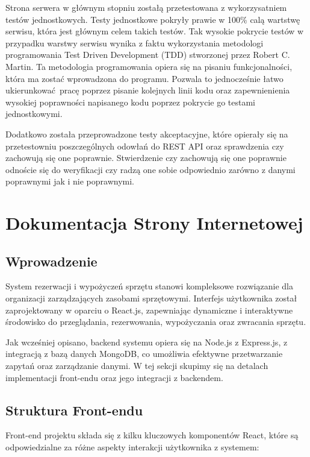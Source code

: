 \documentclass{article}
\begin{document}
Strona serwera w głównym stopniu zostałą przetestowana z wykorzysatniem testów jednostkowych. Testy jednostkowe pokryły prawie w 100\% calą wartstwę serwisu, która jest głównym celem takich testów.
Tak wysokie pokrycie testów w przypadku warstwy serwisu wynika z faktu wykorzystania metodologi programowania Test Driven Development (TDD) stworzonej przez Robert C. Martin. Ta metodologia programowania
opiera się na pisaniu funkcjonalności, która ma zostać wprowadzona do programu. Pozwala to jednocześnie łatwo ukierunkować pracę poprzez pisanie kolejnych linii kodu oraz zapewnienienia wysokiej poprawności
napisanego kodu poprzez pokrycie go testami jednostkowymi.

Dodatkowo została przeprowadzone testy akceptacyjne, które opierały się na przetestowniu poszczególnych odowłań do REST API oraz sprawdzenia czy zachowują się one
poprawnie. Stwierdzenie czy zachowują się one poprawnie odnoście się do weryfikacji czy radzą one sobie odpowiednio zarówno z danymi poprawnymi jak i nie poprawnymi.

\section{Dokumentacja Strony Internetowej}

\subsection{Wprowadzenie}

System rezerwacji i wypożyczeń sprzętu stanowi kompleksowe rozwiązanie dla organizacji zarządzających zasobami sprzętowymi. Interfejs użytkownika został zaprojektowany w oparciu o React.js, zapewniając dynamiczne i interaktywne środowisko do przeglądania, rezerwowania, wypożyczania oraz zwracania sprzętu.

Jak wcześniej opisano, backend systemu opiera się na Node.js z Express.js, z integracją z bazą danych MongoDB, co umożliwia efektywne przetwarzanie zapytań oraz zarządzanie danymi. W tej sekcji skupimy się na detalach implementacji front-endu oraz jego integracji z backendem.

\subsection{Struktura Front-endu}

Front-end projektu składa się z kilku kluczowych komponentów React, które są odpowiedzialne za różne aspekty interakcji użytkownika z systemem:
\end{document}
